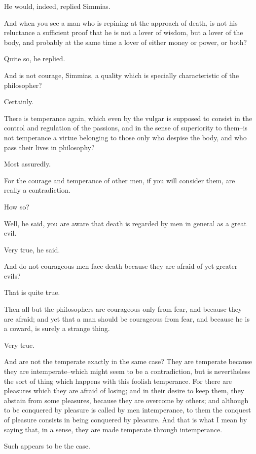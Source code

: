 He would, indeed, replied Simmias.

And when you see a man who is repining at the approach of death, is not
his reluctance a sufficient proof that he is not a lover of wisdom, but
a lover of the body, and probably at the same time a lover of either
money or power, or both?

Quite so, he replied.

And is not courage, Simmias, a quality which is specially characteristic
of the philosopher?

Certainly.

There is temperance again, which even by the vulgar is supposed to
consist in the control and regulation of the passions, and in the sense
of superiority to them--is not temperance a virtue belonging to those
only who despise the body, and who pass their lives in philosophy?

Most assuredly.

For the courage and temperance of other men, if you will consider them,
are really a contradiction.

How so?

Well, he said, you are aware that death is regarded by men in general as
a great evil.

Very true, he said.

And do not courageous men face death because they are afraid of yet
greater evils?

That is quite true.

Then all but the philosophers are courageous only from fear, and because
they are afraid; and yet that a man should be courageous from fear, and
because he is a coward, is surely a strange thing.

Very true.

And are not the temperate exactly in the same case? They are temperate
because they are intemperate--which might seem to be a contradiction,
but is nevertheless the sort of thing which happens with this foolish
temperance. For there are pleasures which they are afraid of losing; and
in their desire to keep them, they abstain from some pleasures, because
they are overcome by others; and although to be conquered by pleasure is
called by men intemperance, to them the conquest of pleasure consists in
being conquered by pleasure. And that is what I mean by saying that, in
a sense, they are made temperate through intemperance.

Such appears to be the case.

